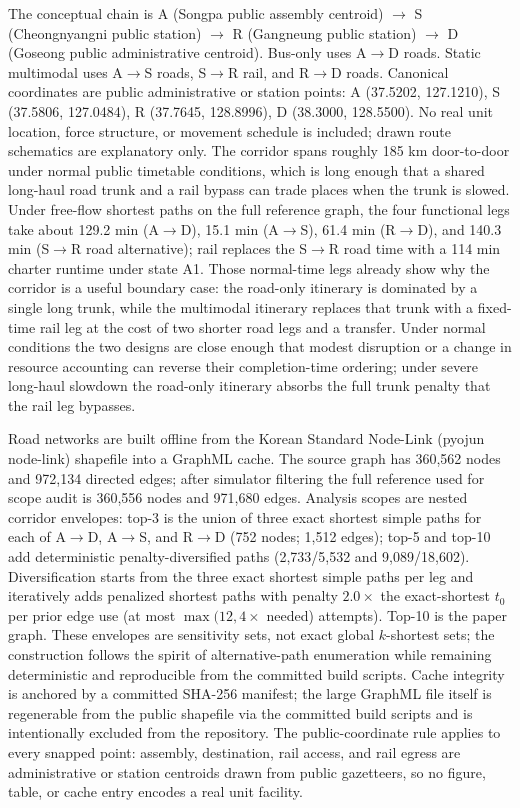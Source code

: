 \documentclass{ieeeaccess}
\begin{document}
The conceptual chain is A (Songpa public assembly centroid) $\rightarrow$ S (Cheongnyangni public station) $\rightarrow$ R (Gangneung public station) $\rightarrow$ D (Goseong public administrative centroid). Bus-only uses A$\rightarrow$D roads. Static multimodal uses A$\rightarrow$S roads, S$\rightarrow$R rail, and R$\rightarrow$D roads. Canonical coordinates are public administrative or station points: A (37.5202, 127.1210), S (37.5806, 127.0484), R (37.7645, 128.8996), D (38.3000, 128.5500). No real unit location, force structure, or movement schedule is included; drawn route schematics are explanatory only. The corridor spans roughly 185 km door-to-door under normal public timetable conditions, which is long enough that a shared long-haul road trunk and a rail bypass can trade places when the trunk is slowed. Under free-flow shortest paths on the full reference graph, the four functional legs take about 129.2 min (A$\rightarrow$D), 15.1 min (A$\rightarrow$S), 61.4 min (R$\rightarrow$D), and 140.3 min (S$\rightarrow$R road alternative); rail replaces the S$\rightarrow$R road time with a 114 min charter runtime under state A1. Those normal-time legs already show why the corridor is a useful boundary case: the road-only itinerary is dominated by a single long trunk, while the multimodal itinerary replaces that trunk with a fixed-time rail leg at the cost of two shorter road legs and a transfer. Under normal conditions the two designs are close enough that modest disruption or a change in resource accounting can reverse their completion-time ordering; under severe long-haul slowdown the road-only itinerary absorbs the full trunk penalty that the rail leg bypasses.

Road networks are built offline from the Korean Standard Node-Link (pyojun node-link) shapefile into a GraphML cache. The source graph has 360{,}562 nodes and 972{,}134 directed edges; after simulator filtering the full reference used for scope audit is 360{,}556 nodes and 971{,}680 edges. Analysis scopes are nested corridor envelopes: top-3 is the union of three exact shortest simple paths for each of A$\rightarrow$D, A$\rightarrow$S, and R$\rightarrow$D (752 nodes; 1{,}512 edges); top-5 and top-10 add deterministic penalty-diversified paths (2{,}733/5{,}532 and 9{,}089/18{,}602). Diversification starts from the three exact shortest simple paths per leg and iteratively adds penalized shortest paths with penalty $2.0\times$ the exact-shortest $t_0$ per prior edge use (at most $\max(12, 4\times$ needed) attempts). Top-10 is the paper graph. These envelopes are sensitivity sets, not exact global $k$-shortest sets; the construction follows the spirit of alternative-path enumeration \cite{b26} while remaining deterministic and reproducible from the committed build scripts. Cache integrity is anchored by a committed SHA-256 manifest; the large GraphML file itself is regenerable from the public shapefile via the committed build scripts and is intentionally excluded from the repository. The public-coordinate rule applies to every snapped point: assembly, destination, rail access, and rail egress are administrative or station centroids drawn from public gazetteers, so no figure, table, or cache entry encodes a real unit facility.
\end{document}
